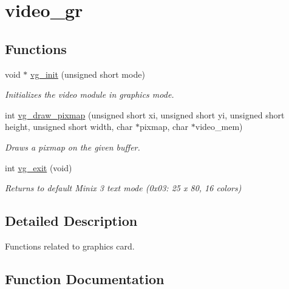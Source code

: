 \hypertarget{group__video__gr}{}\section{video\+\_\+gr}
\label{group__video__gr}
\subsection*{Functions}
\begin{DoxyCompactItemize}
\item 
void $\ast$ \hyperlink{group__video__gr_gacef21667c79365d57a084bed994c2189}{vg\+\_\+init} (unsigned short mode)
\begin{DoxyCompactList}\small\item\em Initializes the video module in graphics mode. \end{DoxyCompactList}\item 
int \hyperlink{group__video__gr_ga8d61f47c55916ab299a43f7fd799d04d}{vg\+\_\+draw\+\_\+pixmap} (unsigned short xi, unsigned short yi, unsigned short height, unsigned short width, char $\ast$pixmap, char $\ast$video\+\_\+mem)
\begin{DoxyCompactList}\small\item\em Draws a pixmap on the given buffer. \end{DoxyCompactList}\item 
int \hyperlink{group__video__gr_ga42f593e6656f1a978315aff02b1bcebf}{vg\+\_\+exit} (void)
\begin{DoxyCompactList}\small\item\em Returns to default Minix 3 text mode (0x03\+: 25 x 80, 16 colors) \end{DoxyCompactList}\end{DoxyCompactItemize}


\subsection{Detailed Description}
Functions related to graphics card. 

\subsection{Function Documentation}
\hypertarget{group__video__gr_ga8d61f47c55916ab299a43f7fd799d04d}{}
